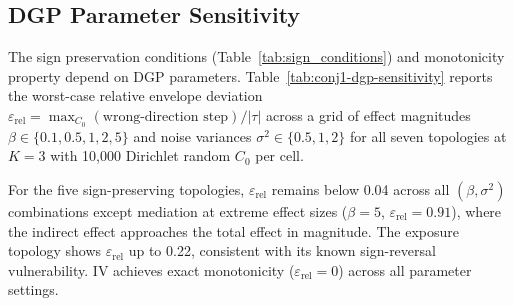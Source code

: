 \subsection{DGP Parameter Sensitivity}
\label{app:dgp_sensitivity}

The sign preservation conditions (Table~\ref{tab:sign_conditions}) and monotonicity property depend on DGP parameters.
Table~\ref{tab:conj1-dgp-sensitivity} reports the worst-case relative envelope deviation $\varepsilon_{\text{rel}} = \max_{C_0}(\text{wrong-direction step})/|\tau|$ across a grid of effect magnitudes $\beta\in\{0.1,0.5,1,2,5\}$ and noise variances $\sigma^2\in\{0.5,1,2\}$ for all seven topologies at $K{=}3$ with 10{,}000 Dirichlet random $C_0$ per cell.

For the five sign-preserving topologies, $\varepsilon_{\text{rel}}$ remains below 0.04 across all $(\beta,\sigma^2)$ combinations except mediation at extreme effect sizes ($\beta{=}5$, $\varepsilon_{\text{rel}}{=}0.91$), where the indirect effect approaches the total effect in magnitude.
The exposure topology shows $\varepsilon_{\text{rel}}$ up to 0.22, consistent with its known sign-reversal vulnerability.
IV achieves exact monotonicity ($\varepsilon_{\text{rel}}{=}0$) across all parameter settings.


